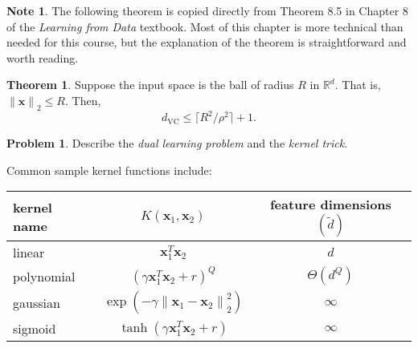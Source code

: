 \documentclass[10pt]{exam}
\theoremstyle{definition}
\newtheorem{problem}{Problem}
\newtheorem{note}{Note}
\newtheorem{theorem}{Theorem}
\newcommand{\R}{\mathbb R}
\newcommand{\trans}[1]{{#1}^{T}}
\newcommand{\x}{\mathbf x}
\newcommand{\ltwo}[1]{{\lVert {#1} \rVert}_2}
\newcommand{\dvc}{{d_{\text{VC}}}}
\begin{document}
\newpage
\begin{note}
The following theorem is copied directly from Theorem 8.5 in Chapter 8 of the \emph{Learning from Data} textbook.
Most of this chapter is more technical than needed for this course,
but the explanation of the theorem is straightforward and worth reading.
\end{note}
\begin{theorem}
    Suppose the input space is the ball of radius $R$ in $\R^d$.
    That is, $\ltwo{\x} \le R$.
    Then,
    \begin{equation}
        \dvc \le \lceil R^2/\rho^2\rceil + 1.
    \end{equation}
\end{theorem}

\newpage
\begin{problem}
    Describe the \emph{dual learning problem} and the \emph{kernel trick}.
\end{problem}


\newpage

\noindent
Common sample kernel functions include:

\vspace{0.15in}
{
\setlength{\tabcolsep}{35pt}
\renewcommand{\arraystretch}{3.5}
\begin{tabular}{lcc}
    \hline
    kernel name & $K(\x_1, \x_2)$ & feature dimensions $(\tilde d)$ \\
    \hline
    linear & $\trans\x_1 \x_2$ & $d$ \\
    polynomial & $(\gamma\trans\x_1\x_2 + r)^Q$ & $\Theta(d^Q)$ \\
    gaussian & $\exp(-\gamma\ltwo{\x_1-\x_2}^2)$ & $\infty$ \\
    sigmoid & $\tanh(\gamma\trans\x_1\x_2 + r)$ & $\infty$ \\
    \hline
\end{tabular}
}
\end{document}
